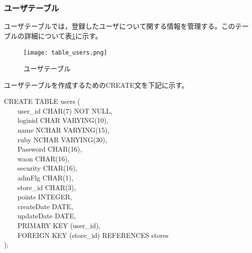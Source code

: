 \documentclass[a4j]{jarticle}
\begin{document}
\subsubsection{ユーザテーブル}
ユーザテーブルでは，登録したユーザについて関する情報を管理する。このテーブルの詳細について表\ref{table_users}に示す。
\begin{figure}[H]
  \begin{center}
    \texttt{[image: table\_users.png]} \\
    \caption{ユーザテーブル}
    \label{table_users}
  \end{center}
\end{figure}
ユーザテーブルを作成するためのCREATE文を下記に示す。
\begin{screen}
CREATE TABLE users (\\
　　user\_id CHAR(7) NOT NULL,\\
　　loginid CHAR VARYING(10),\\
　　name NCHAR VARYING(15),\\
　　ruby NCHAR VARYING(30),\\
　　Password CHAR(16),\\
　　waon CHAR(16),\\
　　security CHAR(16),\\
　　admFlg CHAR(1),\\
　　store\_id CHAR(3),\\
　　points INTEGER,\\
　　createDate DATE,\\
　　updateDate DATE,\\
　　PRIMARY KEY (user\_id),\\
　　FOREIGN KEY (store\_id) REFERENCES stores\\
);
\end{screen}
\end{document}
